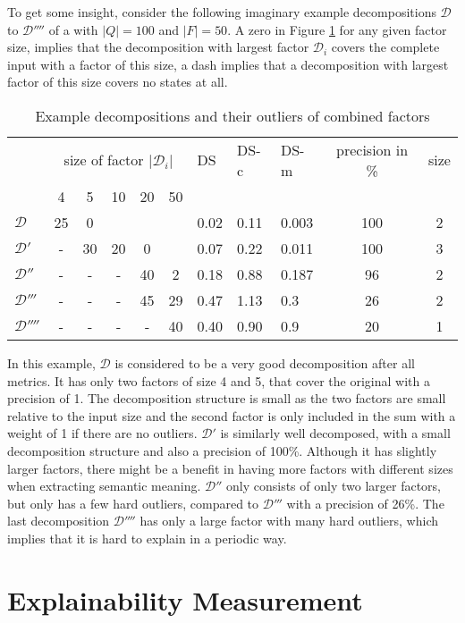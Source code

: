 To get some insight, consider the following imaginary example decompositions $\mathcal{D}$ to $\mathcal{D}''''$ of a \DFA with $|Q| = 100$ and $|F| = 50$.
A zero in Figure \ref{tab:metric-example-decompositions} for any given factor size, implies that the decomposition with largest factor $\mathcal{D}_i$ covers the complete input \DFA with a factor of this size, a dash implies that a decomposition with largest factor of this size covers no states at all.
\begin{table}[h]
	\centering
	\begin{tabular}{l|ccccc|lllcc}
		& \multicolumn{5}{c}{size of factor $|\mathcal{D}_i|$} & DS & DS-c & DS-m & precision in \% & size \\
		& 4 & 5 & 10 & 20 & 50 & & & & & \\
		\hline
		$\mathcal{D}$ & 25 & 0 & &  & & 0.02 & 0.11 & 0.003 & 100 & 2\\		
		$\mathcal{D}'$ & - & 30 & 20 & 0 & & 0.07 & 0.22& 0.011 & 100 & 3\\
		$\mathcal{D}''$ & - & - & - & 40 & 2 & 0.18 & 0.88 & 0.187 &  96 & 2\\
		$\mathcal{D}'''$ & - & - & - & 45 & 29 & 0.47 & 1.13 & 0.3 & 26 & 2\\
		$\mathcal{D}''''$ & - & - & - & - & 40 & 0.40 & 0.90 & 0.9 & 20 & 1\\
	\end{tabular}
	\caption{Example decompositions and their outliers of combined factors}
	\label{tab:metric-example-decompositions}
\end{table}
In this example, $\mathcal{D}$ is considered to be a very good decomposition after all metrics. It has only two factors of size 4 and 5, that cover the original \DFA with a precision of 1.
The decomposition structure is small as the two factors are small relative to the input size and the second factor is only included in the sum with a weight of 1 if there are no outliers.
$\mathcal{D}'$ is similarly well decomposed, with a small decomposition structure and also a precision of 100\%.
Although it has slightly larger factors, there might be a benefit in having more factors with different sizes when extracting semantic meaning.
$\mathcal{D}''$ only consists of only two larger factors, but only has a few hard outliers, compared to $\mathcal{D}'''$ with a precision of 26\%.
The last decomposition $\mathcal{D}''''$ has only a large factor with many hard outliers, which implies that it is hard to explain in a periodic way.

\section{Explainability Measurement}


